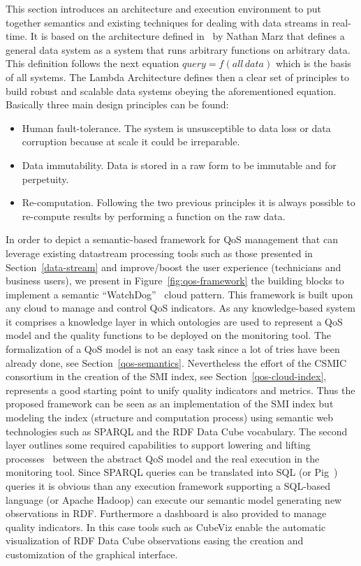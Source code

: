 This section introduces an architecture and execution environment to put together 
semantics and existing techniques for dealing with data streams in real-time. 
It is based on the architecture defined in~\cite{BigDataManing} by Nathan Marz that defines 
a general data system as a system that runs arbitrary functions on arbitrary data. This definition 
follows the next equation $query=f(all\,data)$ which is the basis of all systems. The Lambda 
Architecture defines then a clear set of principles to build robust and scalable data 
systems obeying the aforementioned equation. Basically three main design principles 
can be found:
\begin{itemize}
 \item Human fault-tolerance. The system is unsusceptible to data loss or data corruption because at scale it could be irreparable.
 \item Data immutability. Data is stored in a raw form to be immutable and for perpetuity.
 \item Re-computation. Following the two previous principles it is always possible 
 to re-compute results by performing a function on the raw data.
\end{itemize}

In order to depict a semantic-based framework for QoS management that can leverage existing datastream processing 
tools such as those presented in Section~\ref{data-stream} and improve/boost the user experience (technicians and business users), 
we present in Figure~\ref{fig:qos-framework} the building blocks to implement a semantic ``WatchDog''~\cite{watchdog} cloud pattern. This framework is built 
upon any cloud to manage and control QoS indicators. As any knowledge-based system it comprises a knowledge layer in which 
ontologies are used to represent a QoS model and the quality functions to be deployed on the monitoring tool. The formalization of a 
QoS model is not an easy task since a lot of tries have been already done, see Section~\ref{qos-semantics}. Nevertheless the 
effort of the CSMIC consortium in the creation of the SMI index, see Section~\ref{qos-cloud-index}, represents a good starting point to unify quality indicators 
and metrics. Thus the proposed framework can be seen as an implementation of the SMI index but modeling the index (structure and computation process) 
using semantic web technologies such as SPARQL and the RDF Data Cube vocabulary. The second layer outlines some required capabilities to support lowering and lifting processes~\cite{DBLP:journals/jucs/RodriguezRMPGP12} 
between the abstract QoS model and the real execution in the monitoring tool. Since SPARQL queries can be translated into SQL (or Pig~\cite{Schatzle:2011:PMS:1999299.1999303}) queries 
it is obvious than any execution framework supporting a SQL-based language (or Apache Hadoop) can execute our semantic model generating new observations in RDF. Furthermore a dashboard is also provided to manage quality indicators. In this case 
tools such as CubeViz enable the automatic visualization of RDF Data Cube observations easing the creation and customization of the graphical interface.

